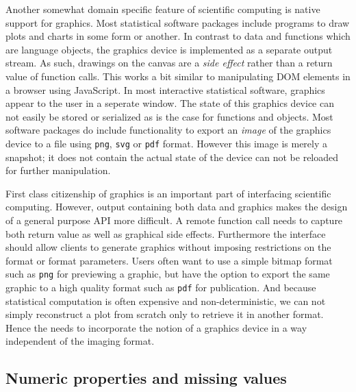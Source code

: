 Another somewhat domain specific feature of scientific computing is native support for graphics. Most statistical software packages include programs to draw plots and charts in some form or another. In contrast to data and functions which are language objects, the graphics device is implemented as a separate output stream. As such, drawings on the canvas are a \emph{side effect} rather than a return value of function calls. This works a bit similar to manipulating DOM elements in a browser using JavaScript. In most interactive statistical software, graphics appear to the user in a seperate window. The state of this graphics device can not easily be stored or serialized as is the case for functions and objects. Most software packages do include functionality to export an \emph{image} of the graphics device to a file using \texttt{png}, \texttt{svg} or \texttt{pdf} format. However this image is merely a snapshot; it does not contain the actual state of the device can not be reloaded for further manipulation.

First class citizenship of graphics is an important part of interfacing scientific computing. However, output containing both data and graphics makes the design of a general purpose API more difficult. A remote function call needs to capture both return value as well as graphical side effects. Furthermore the interface should allow clients to generate graphics without imposing restrictions on the format or format parameters. Users often want to use a simple bitmap format such as \texttt{png} for previewing a graphic, but have the option to export the same graphic to a high quality format such as \texttt{pdf} for publication. And because statistical computation is often expensive and non-deterministic, we can not simply reconstruct a plot from scratch only to retrieve it in another format. Hence the \API needs to incorporate the notion of a graphics device in a way independent of the imaging format. 

\subsection{Numeric properties and missing values}

